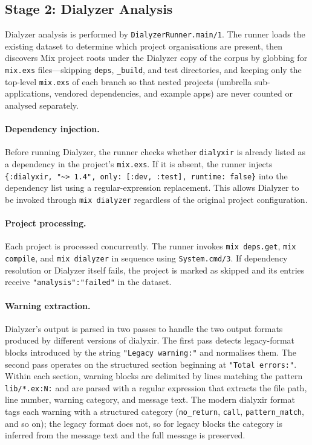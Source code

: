 \subsection{Stage 2: Dialyzer Analysis}

Dialyzer analysis is performed by \texttt{DialyzerRunner.main/1}.
The runner loads the existing dataset to determine which project organisations are present, then discovers Mix project roots under the Dialyzer copy of the corpus by globbing for \texttt{mix.exs} files---skipping \texttt{deps}, \texttt{\_build}, and test directories, and keeping only the top-level \texttt{mix.exs} of each branch so that nested projects (umbrella sub-applications, vendored dependencies, and example apps) are never counted or analysed separately.

\paragraph{Dependency injection.}
Before running Dialyzer, the runner checks whether \texttt{dialyxir} is already listed as a dependency in the project's \texttt{mix.exs}.
If it is absent, the runner injects \texttt{\{:dialyxir, "\textasciitilde> 1.4", only: [:dev, :test], runtime: false\}} into the dependency list using a regular-expression replacement.
This allows Dialyzer to be invoked through \texttt{mix dialyzer} regardless of the original project configuration.

\paragraph{Project processing.}
Each project is processed concurrently.
The runner invokes \texttt{mix deps.get}, \texttt{mix compile}, and \texttt{mix dialyzer} in sequence using \texttt{System.cmd/3}.
If dependency resolution or Dialyzer itself fails, the project is marked as skipped and its entries receive \texttt{"analysis":"failed"} in the dataset.

\paragraph{Warning extraction.}
Dialyzer's output is parsed in two passes to handle the two output formats produced by different versions of dialyxir.
The first pass detects legacy-format blocks introduced by the string \texttt{"Legacy warning:"} and normalises them.
The second pass operates on the structured section beginning at \texttt{"Total errors:"}.
Within each section, warning blocks are delimited by lines matching the pattern \texttt{lib/*.ex:N:} and are parsed with a regular expression that extracts the file path, line number, warning category, and message text.
The modern dialyxir format tags each warning with a structured category (\texttt{no\_return}, \texttt{call}, \texttt{pattern\_match}, and so on); the legacy format does not, so for legacy blocks the category is inferred from the message text and the full message is preserved.

